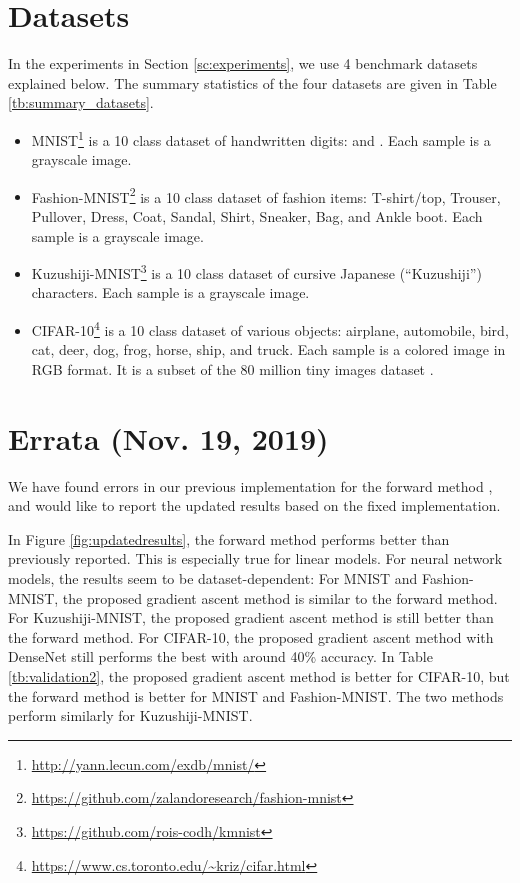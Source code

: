 \documentclass{article}
\begin{document}
\section{Datasets}
\label{sec:datasets}
In the experiments in Section \ref{sc:experiments}, we use 4 benchmark datasets explained below.
The summary statistics of the four datasets are given in Table \ref{tb:summary_datasets}.
\begin{itemize}
\item MNIST\footnote{\url{http://yann.lecun.com/exdb/mnist/}} \citep{Lecun98gradient-basedlearning} is a 10 class dataset of handwritten digits:  and .  Each sample is a  grayscale image.
\item Fashion-MNIST\footnote{\url{https://github.com/zalandoresearch/fashion-mnist}} \citep{fashion} is a 10 class dataset of fashion items: T-shirt/top, Trouser, Pullover, Dress, Coat, Sandal, Shirt, Sneaker, Bag, and Ankle boot.  Each sample is a  grayscale image.
\item Kuzushiji-MNIST\footnote{\url{https://github.com/rois-codh/kmnist}} \citep{clanuwat18neurips} is a 10 class dataset of cursive Japanese (``Kuzushiji'') characters.  Each sample is a  grayscale image.
\item CIFAR-10\footnote{\url{https://www.cs.toronto.edu/~kriz/cifar.html}} is a 10 class dataset of various objects: airplane, automobile, bird, cat, deer, dog, frog, horse, ship, and truck.  Each sample is a colored image in  RGB format.  It is a subset of the 80 million tiny images dataset \citep{Torralba08pami}.
\end{itemize}

\newpage
\onecolumn
\section*{Errata (Nov. 19, 2019)}

We have found errors in our previous implementation for the forward method \citep{yu17eccv}, and would like to report the updated results based on the fixed implementation.

In Figure \ref{fig:updatedresults}, the forward method performs better than previously reported.  This is especially true for linear models.  For neural network models,  the results seem to be dataset-dependent:  For MNIST and Fashion-MNIST, the proposed gradient ascent method is similar to the forward method.  For Kuzushiji-MNIST, the proposed gradient ascent method is still better than the forward method.  For CIFAR-10, the proposed gradient ascent method with DenseNet still performs the best with around 40\% accuracy.  In Table \ref{tb:validation2}, the proposed gradient ascent method is better for CIFAR-10, but the forward method is better for MNIST and Fashion-MNIST.  The two methods perform similarly for Kuzushiji-MNIST.
\end{document}
